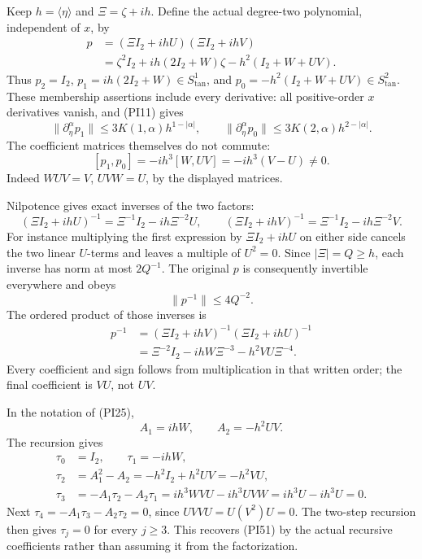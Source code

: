 \documentclass[
  11pt,
]{article}
\begin{document}
Keep \(h=\langle\eta\rangle\) and \(\Xi=\zeta+ih\). Define the actual
degree-two polynomial, independent of \(x\), by \[
 \begin{split}
 p&=(\Xi I_2+ihU)(\Xi I_2+ihV)\\
  &=\zeta^2I_2+ih(2I_2+W)\zeta-h^2(I_2+W+UV).
 \end{split}
 \tag{PI46}
\] Thus \(p_2=I_2\), \(p_1=ih(2I_2+W)\in S^1_{\mathrm{tan}}\), and
\(p_0=-h^2(I_2+W+UV)\in S^2_{\mathrm{tan}}\). These membership
assertions include every derivative: all positive-order \(x\)
derivatives vanish, and (PI11) gives \[
 \|\partial_\eta^\alpha p_1\|
 \leq3K(1,\alpha)h^{1-|\alpha|},\qquad
 \|\partial_\eta^\alpha p_0\|
 \leq3K(2,\alpha)h^{2-|\alpha|}.
 \tag{PI47}
\] The coefficient matrices themselves do not commute: \[
 [p_1,p_0]
 =-ih^3[W,UV]
 =-ih^3(V-U)\ne0.
 \tag{PI48}
\] Indeed \(WUV=V\), \(UVW=U\), by the displayed matrices.

Nilpotence gives exact inverses of the two factors: \[
 (\Xi I_2+ihU)^{-1}
 =\Xi^{-1}I_2-ih\Xi^{-2}U,\qquad
 (\Xi I_2+ihV)^{-1}
 =\Xi^{-1}I_2-ih\Xi^{-2}V.
 \tag{PI49}
\] For instance multiplying the first expression by \(\Xi I_2+ihU\) on
either side cancels the two linear \(U\)-terms and leaves a multiple of
\(U^2=0\). Since \(|\Xi|=Q\geq h\), each inverse has norm at most
\(2Q^{-1}\). The original \(p\) is consequently invertible everywhere
and obeys \[
 \|p^{-1}\|\leq4Q^{-2}.
 \tag{PI50}
\] The ordered product of those inverses is \[
 \begin{split}
 p^{-1}
 &=(\Xi I_2+ihV)^{-1}(\Xi I_2+ihU)^{-1}\\
 &=\Xi^{-2}I_2-ihW\Xi^{-3}-h^2VU\Xi^{-4}.
 \end{split}
 \tag{PI51}
\] Every coefficient and sign follows from multiplication in that
written order; the final coefficient is \(VU\), not \(UV\).

In the notation of (PI25), \[
 A_1=ihW,\qquad A_2=-h^2UV.
 \tag{PI52}
\] The recursion gives \[
 \begin{split}
 \tau_0&=I_2,\qquad \tau_1=-ihW,\\
 \tau_2&=A_1^2-A_2=-h^2I_2+h^2UV=-h^2VU,\\
 \tau_3&=-A_1\tau_2-A_2\tau_1
 =ih^3WVU-ih^3UVW=ih^3U-ih^3U=0.
 \end{split}
 \tag{PI53}
\] Next \(\tau_4=-A_1\tau_3-A_2\tau_2=0\), since \(UVVU=U(V^2)U=0\). The
two-step recursion then gives \(\tau_j=0\) for every \(j\geq3\). This
recovers (PI51) by the actual recursive coefficients rather than
assuming it from the factorization.
\end{document}
